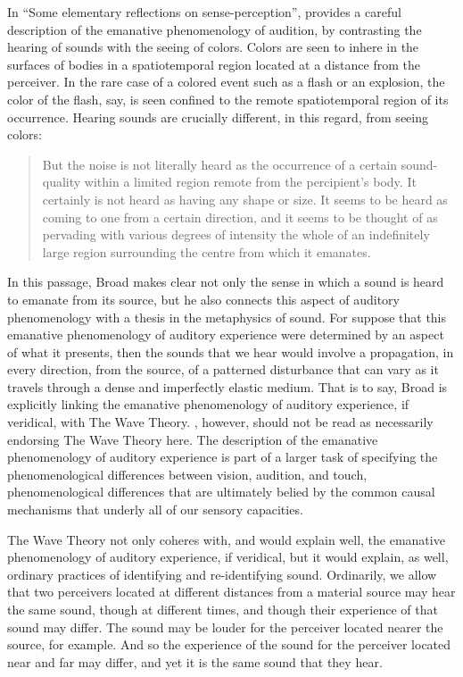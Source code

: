 In ``Some elementary reflections on sense-perception'', \citet{Broad:1952kx} provides a careful description of the emanative phenomenology of audition, by contrasting the hearing of sounds with the seeing of colors. Colors are seen to inhere in the surfaces of bodies in a spatiotemporal region located at a distance from the perceiver. In the rare case of a colored event such as a flash or an explosion, the color of the flash, say, is seen confined to the remote spatiotemporal region of its occurrence. Hearing sounds are crucially different, in this regard, from seeing colors:
\begin{quote}
	But the noise is not literally heard as the occurrence of a certain sound-quality within a limited region remote from the percipient's body. It certainly is not heard as having any shape or size. It seems to be heard as coming to one from a certain direction, and it seems to be thought of as pervading with various degrees of intensity the whole of an indefinitely large region surrounding the centre from which it emanates. \citep[5]{Broad:1952kx}
\end{quote}
In this passage, Broad makes clear not only the sense in which a sound is heard to emanate from its source, but he also connects this aspect of auditory phenomenology with a thesis in the metaphysics of sound. For suppose that this emanative phenomenology of auditory experience were determined by an aspect of what it presents, then the sounds that we hear would involve a propagation, in every direction, from the source, of a patterned disturbance that can vary as it travels through a dense and imperfectly elastic medium. That is to say, Broad is explicitly linking the emanative phenomenology of auditory experience, if veridical, with The Wave Theory. \citet{Broad:1952kx}, however, should not be read as necessarily endorsing The Wave Theory here. The description of the emanative phenomenology of auditory experience is part of a larger task of specifying the phenomenological differences between vision, audition, and touch, phenomenological differences that are ultimately belied by the common causal mechanisms that underly all of our sensory capacities.

The Wave Theory not only coheres with, and would explain well, the emanative phenomenology of auditory experience, if veridical, but it would explain, as well, ordinary practices of identifying and re-identifying sound. Ordinarily, we allow that two perceivers located at different distances from a material source may hear the same sound, though at different times, and though their experience of that sound may differ. The sound may be louder for the perceiver located nearer the source, for example. And so the experience of the sound for the perceiver located near and far may differ, and yet it is the same sound that they hear. 

